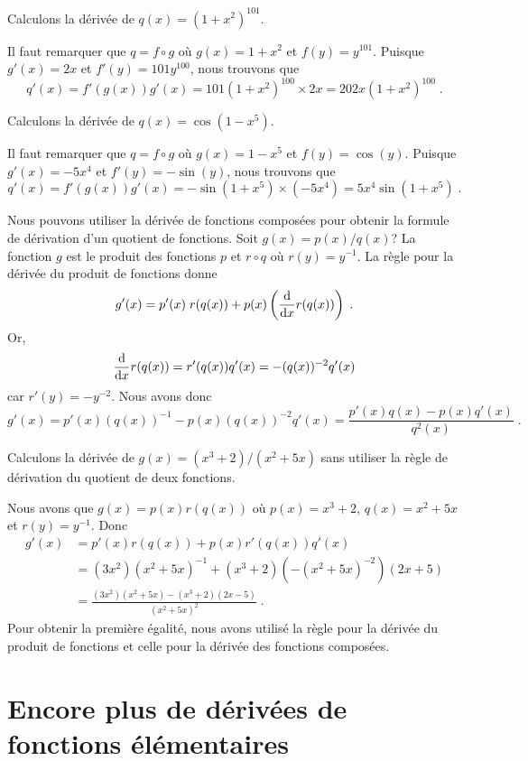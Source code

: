 {\begin{egg}
Calculons la dérivée de $q(x) = (1+x^2)^{101}$.

Il faut remarquer que
$q = f\circ g$ où $g(x) = 1 + x^2$ et $f(y) = y^{101}$.  Puisque
$g'(x) = 2x$ et $f'(y) = 101 y^{100}$, nous trouvons que
\[
q'(x) = f'(g(x)) g'(x) = 101 (1+x^2)^{100} \times 2 x
= 202 x (1+x^2)^{100} \; .
\]
\end{egg}

\begin{egg}
Calculons la dérivée de $q(x) = \cos(1-x^5)$.

Il faut remarquer que
$q = f\circ g$ où $g(x) = 1-x^5$ et $f(y) = \cos(y)$.  Puisque
$g'(x) = -5x^4$ et $f'(y) = -\sin(y)$, nous trouvons que
\[
q'(x) = f'(g(x)) g'(x) = -\sin(1+x^5) \times (-5x^4)
= 5x^4 \sin(1+x^5) \; .
\]
\end{egg}

\begin{egg}
Nous pouvons utiliser la dérivée de fonctions composées pour obtenir la
formule de dérivation d'un quotient de fonctions.  Soit
$g(x) = p(x) / q(x)$?  La fonction $g$ est le produit des fonctions
$p$ et $r \circ q$ où $r(y) = y^{-1}$.  La règle pour la dérivée du
produit de fonctions donne
\[
g'(x) = p'(x)\; r(q(x)) + p(x)
\left(\dfdx{r(q(x))}{x}\right) \; .
\]
Or,
\[
\dfdx{r(q(x))}{x} = r'(q(x)) q'(x) = - (q(x))^{-2} q'(x)
\]
car $r'(y) = -y^{-2}$.  Nous avons donc
\[
g'(x) = p'(x) (q(x))^{-1} - p(x) (q(x))^{-2} q'(x)
= \frac{p'(x) q(x) - p(x) q'(x)}{q^2(x)} \; .
\]
\end{egg}

\begin{egg}
Calculons la dérivée de $g(x) = (x^3+2)/(x^2+5x)$ sans utiliser la
règle de dérivation du quotient de deux fonctions.

Nous avons que $g(x) = p(x) r(q(x))$ où $p(x) = x^3+2$, $q(x) = x^2+5x$ et
$r(y) = y^{-1}$.  Donc
\begin{align*}
g'(x) &= p'(x) r(q(x)) + p(x) r'(q(x)) q'(x) \\
&= (3x^2)(x^2+5x)^{-1} + (x^3+2) \left( -(x^2+5x)^{-2}\right) (2x + 5)\\
&= \frac{(3x^2)(x^2+5x) - (x^3 + 2)(2x-5)}{(x^2+5x)^2} \; .
\end{align*}
Pour obtenir la première égalité, nous avons utilisé la règle pour la
dérivée du produit de fonctions et celle pour la dérivée des fonctions
composées.
\end{egg}

\section{Encore plus de dérivées de fonctions élémentaires}

}
